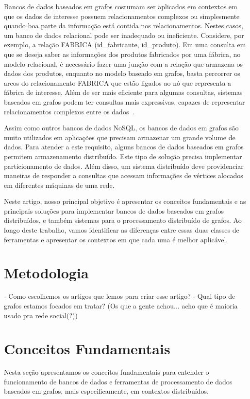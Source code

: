 \documentclass[conference]{IEEEtran}
\begin{document}
Bancos de dados baseados em grafos costumam ser aplicados em contextos
em que os dados de interesse possuem relacionamentos complexos ou
simplesmente quando boa parte da informação está contida nos
relacionamentos. Nestes casos, um banco de dados relacional pode ser
inadequado ou ineficiente. Considere, por exemplo, a relação
{\ttfamily FABRICA (id\_fabricante, id\_produto)}. Em uma consulta em
que se deseja saber as informações dos produtos fabricados por uma
fábrica, no modelo relacional, é necessário fazer uma junção com a
relação que armazena os dados dos produtos, enquanto no modelo baseado
em grafos, basta percorrer os arcos do relacionamento
{\ttfamily FABRICA} que estão ligados ao nó que representa a fábrica de
interesse. Além de ser mais eficiente para algumas consultas, sistemas
baseados em grafos podem ter consultas mais expressivas, capazes de
representar relacionamentos complexos entre os dados~\cite{neo4jquery}.

Assim como outros bancos de dados NoSQL, os bancos de dados em grafos
são muito utilizados em aplicações que precisam armazenar um grande
volume de dados. Para atender a este requisito, alguns bancos de dados
baseados em grafos permitem armazenamento distribuído. Este tipo de
solução precisa implementar particionamento de dados. Além disso, um
sistema distribuído deve providenciar maneiras de responder a consultas
que acessam informações de vértices alocados em diferentes máquinas de
uma rede.

Neste artigo, nosso principal objetivo é apresentar os conceitos
fundamentais e as principais soluções para implementar bancos de dados
baseados em grafos distribuídos, e também sistemas para o processamento
distribuído de grafos. Ao longo deste trabalho, vamos identificar as diferenças
entre essas duas classes de ferramentas e apresentar os contextos em que cada
uma é melhor aplicável.

\section{Metodologia}
- Como escolhemos os artigos que lemos para criar esse artigo?
- Qual tipo de grafos estamos focados em tratar? (Os que a gente achou...
acho que é maioria usado pra rede social(?))

\section{Conceitos Fundamentais}
Nesta seção apresentamos os conceitos fundamentais para entender o
funcionamento de bancos de dados e ferramentas de processamento de dados
baseados em grafos, mais especificamente, em contextos distribuídos.
\end{document}
